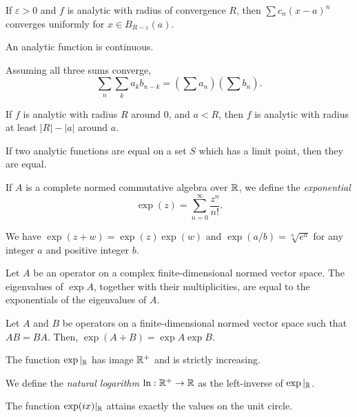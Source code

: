 \begin{prop}
    If $\varepsilon>0$ and $f$ is analytic with radius of convergence $R$, then
    $\sum c_n (x-a)^n$ converges uniformly for $x\in B_{R-\varepsilon}(a)$.
\end{prop}
\begin{thm}[Abel]
    An analytic function is continuous.
\end{thm}
\begin{cor}
    Assuming all three sums converge,
    \[\sum_n\sum_k a_k b_{n-k}=\left(\sum a_n\right)\left(\sum b_n\right).\]
\end{cor}
\begin{thm}[Taylor]
    If $f$ is analytic with radius $R$ around $0$, and $a<R$, then $f$ is
    analytic with radius at least $|R|-|a|$ around $a$.
\end{thm}
\begin{prop}
    If two analytic functions are equal on a set $S$ which
    has a limit point, then they are equal.
\end{prop}
\begin{defn}
    If $A$ is a complete normed commutative algebra over $\mathbb{R}$, we define the \emph{exponential}
    \[\exp(z)=\sum_{n=0}^\infty\frac{z^n}{n!}.\]
\end{defn}
\begin{prop}
    We have $\exp(z+w)=\exp(z)\exp(w)$
    and $\exp(a/b)=\sqrt[b]{e^a}$ for any integer $a$ and positive integer $b$.
\end{prop}
\begin{prop}
  Let $A$ be an operator on a complex finite-dimensional normed vector space.
  The eigenvalues of $\exp A$, together with their multiplicities, are
  equal to the exponentials of the eigenvalues of $A$.
\end{prop}
\begin{prop}
  Let $A$ and $B$ be operators on a finite-dimensional normed vector space such
  that $AB=BA$. Then, $\exp(A+B)=\exp A\exp B$.
\end{prop}
\begin{prop}
    The function $\exp|_{\mathbb{R}}$ has image $\mathbb{R}^+$ and is strictly increasing.
\end{prop}
\begin{defn}
    We define the \emph{natural logarithm} $\ln:\mathbb{R}^+\to\mathbb{R}$ as the left-inverse
    of $\exp|_{\mathbb{R}}$.
\end{defn}
\begin{prop}
    The function $\exp(ix)|_{\mathbb{R}}$ attains exactly the values on the unit circle.
\end{prop}

